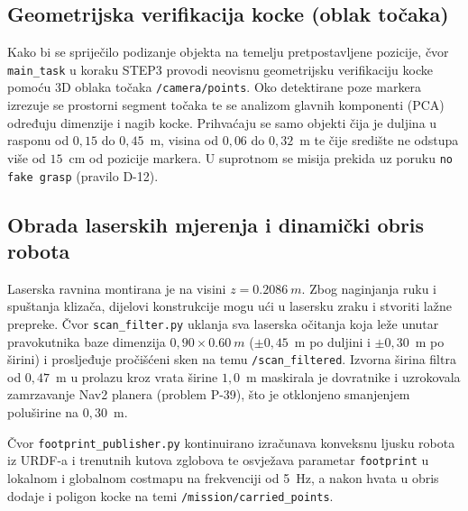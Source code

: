 \subsection{Geometrijska verifikacija kocke (oblak točaka)}
\label{sec:05-verifikacija}

Kako bi se spriječilo podizanje objekta na temelju pretpostavljene pozicije, čvor \texttt{main\_task}
u koraku STEP3 provodi neovisnu geometrijsku verifikaciju kocke pomoću 3D oblaka točaka
\texttt{/camera/points}. Oko detektirane poze markera izrezuje se prostorni segment točaka te se
analizom glavnih komponenti (PCA) određuju dimenzije i nagib kocke. Prihvaćaju se samo objekti
čija je duljina u rasponu od $0{,}15$ do $0{,}45$~m, visina od $0{,}06$ do $0{,}32$~m te čije
središte ne odstupa više od $15$~cm od pozicije markera. U suprotnom se misija prekida uz poruku
\texttt{no fake grasp} (pravilo D-12).

\subsection{Obrada laserskih mjerenja i dinamički obris robota}
\label{sec:05-scan-filter}

Laserska ravnina montirana je na visini $z = \SI{0.2086}{m}$. Zbog naginjanja ruku i spuštanja
klizača, dijelovi konstrukcije mogu ući u lasersku zraku i stvoriti lažne prepreke. Čvor
\texttt{scan\_filter.py} uklanja sva laserska očitanja koja leže unutar pravokutnika baze dimenzija
$0{,}90 \times \SI{0.60}{m}$ ($\pm 0{,}45$~m po duljini i $\pm 0{,}30$~m po širini) i prosljeđuje
pročišćeni sken na temu \texttt{/scan\_filtered}. Izvorna širina filtra od $0{,}47$~m u prolazu kroz
vrata širine $1{,}0$~m maskirala je dovratnike i uzrokovala zamrzavanje Nav2 planera (problem P-39),
što je otklonjeno smanjenjem poluširine na $0{,}30$~m.

Čvor \texttt{footprint\_publisher.py} kontinuirano izračunava konveksnu ljusku robota iz URDF-a i
trenutnih kutova zglobova te osvježava parametar \texttt{footprint} u lokalnom i globalnom costmapu
na frekvenciji od 5~Hz, a nakon hvata u obris dodaje i poligon kocke na temi
\texttt{/mission/carried\_points}.
